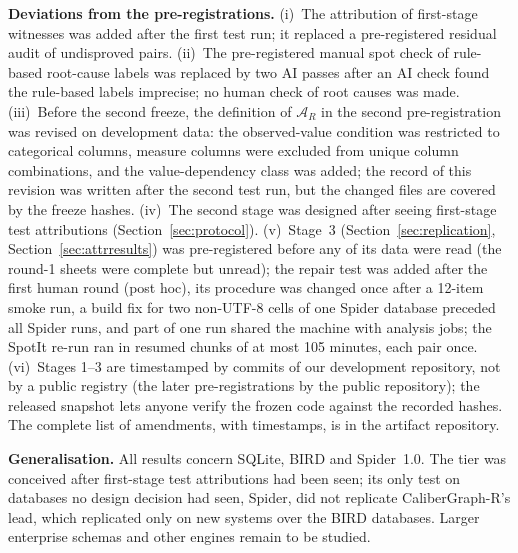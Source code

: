 \textbf{Deviations from the pre-registrations.} (i)~The attribution of first-stage witnesses was added after the first test run; it replaced a pre-registered residual audit of undisproved pairs. (ii)~The pre-registered manual spot check of rule-based root-cause labels was replaced by two AI passes after an AI check found the rule-based labels imprecise; no human check of root causes was made. (iii)~Before the second freeze, the definition of $\mathcal A_R$ in the second pre-registration was revised on development data: the observed-value condition was restricted to categorical columns, measure columns were excluded from unique column combinations, and the value-dependency class was added; the record of this revision was written after the second test run, but the changed files are covered by the freeze hashes. (iv)~The second stage was designed after seeing first-stage test attributions (Section~\ref{sec:protocol}). (v)~Stage~3 (Section~\ref{sec:replication}, Section~\ref{sec:attrresults}) was pre-registered before any of its data were read (the round-1 sheets were complete but unread); the repair test was added after the first human round (post hoc), its procedure was changed once after a 12-item smoke run, a build fix for two non-UTF-8 cells of one Spider database preceded all Spider runs, and part of one run shared the machine with analysis jobs; the SpotIt re-run ran in resumed chunks of at most 105 minutes, each pair once. (vi)~Stages 1--3 are timestamped by commits of our development repository, not by a public registry (the later pre-registrations by the public repository); the released snapshot lets anyone verify the frozen code against the recorded hashes. The complete list of amendments, with timestamps, is in the artifact repository.

\textbf{Generalisation.} All results concern SQLite, BIRD and Spider~1.0. The tier was conceived after first-stage test attributions had been seen; its only test on databases no design decision had seen, Spider, did not replicate CaliberGraph-R's lead, which replicated only on new systems over the BIRD databases. Larger enterprise schemas and other engines remain to be studied.
